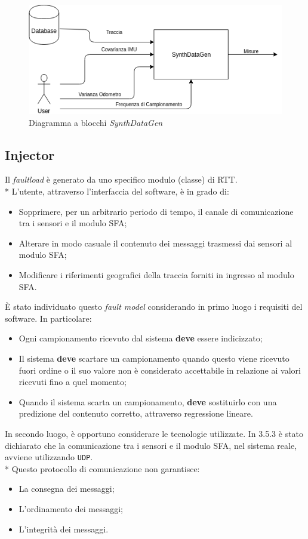 \begin{figure}[h]
	\centering
	\includegraphics[width=0.7\linewidth]{img/SynthDataGen}
	\caption{Diagramma a blocchi \emph{SynthDataGen}}
	\label{fig:synthdatagen}
\end{figure}
\subsection{Injector}
Il \emph{faultload} \`e generato da uno specifico modulo (classe) di RTT.\\*
L'utente, attraverso l'interfaccia del software, \`e in grado di:
\begin{itemize}
	\item Sopprimere, per un arbitrario periodo di tempo, il canale di comunicazione tra i sensori e il modulo SFA;
	\item Alterare in modo casuale il contenuto dei messaggi trasmessi dai sensori al modulo SFA;
	\item Modificare i riferimenti geografici della traccia forniti in ingresso al modulo SFA.
\end{itemize}
\`E stato individuato questo \emph{fault model} considerando in primo luogo i requisiti del software. In particolare:
\begin{itemize}
		\item Ogni campionamento ricevuto dal sistema \textbf{deve} essere indicizzato;
		\item Il sistema \textbf{deve} scartare un campionamento quando questo viene ricevuto fuori ordine o il suo valore non \`e considerato accettabile in relazione ai valori ricevuti fino a quel momento;
		\item Quando il sistema scarta un campionamento, \textbf{deve} sostituirlo con una predizione del contenuto corretto, attraverso regressione lineare.
\end{itemize}
In secondo luogo, \`e opportuno considerare le tecnologie utilizzate. In 3.5.3 \`e stato dichiarato che la comunicazione tra i sensori e il modulo SFA, nel sistema reale, avviene utilizzando \texttt{UDP}.\\*
Questo protocollo di comunicazione non garantisce:
	\begin{itemize}
		\item La consegna dei messaggi;
		\item L'ordinamento dei messaggi;
		\item L'integrit\`a dei messaggi.
	\end{itemize}

